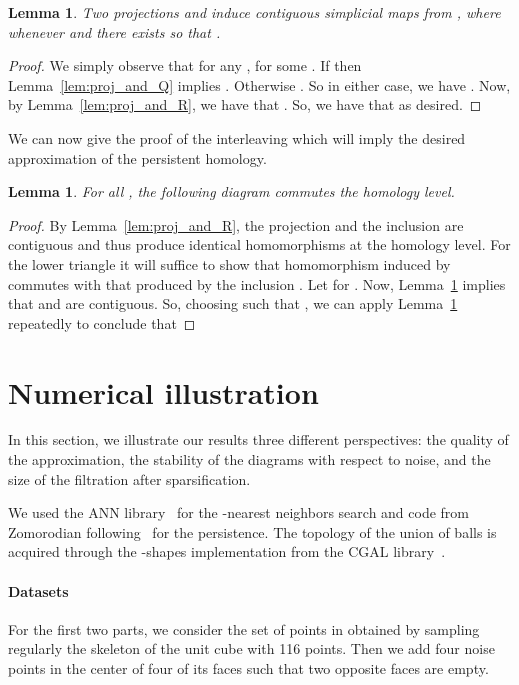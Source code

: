 \documentclass[a4paper]{article}
\newtheorem{lemma}[theorem]{Lemma}
\begin{document}
  \begin{lemma}\label{lem:proj_and_T}
    Two projections  and  induce contiguous simplicial maps from , where  whenever  and there exists  so that .
  \end{lemma}
  \begin{proof}
    We simply observe that for any ,  for some .
    If  then Lemma~\ref{lem:proj_and_Q} implies .
    Otherwise .
    So in either case, we have .
    Now, by Lemma~\ref{lem:proj_and_R}, we have that .
    So, we have that  as desired.
  \end{proof}

  We can now give the proof of the interleaving which will imply the desired approximation of the persistent homology.

  \begin{lemma}\label{lem:interleaving}
    For all , the following diagram commutes the homology level.
    
  \end{lemma}
  \begin{proof}
    By Lemma~\ref{lem:proj_and_R}, the projection  and the inclusion  are contiguous and thus produce identical homomorphisms at the homology level.
    For the lower triangle it will suffice to show that homomorphism induced by  commutes with that produced by the inclusion .
    Let  for .
    Now, Lemma~\ref{lem:proj_and_T} implies that  and  are contiguous.
    So, choosing  such that , we can apply Lemma~\ref{lem:proj_and_T} repeatedly to conclude that
    
  \end{proof}

%
 

\section{Numerical illustration} \label{sNumeric}


In this section, we illustrate our results three different perspectives:
the quality of the approximation,
the stability of the diagrams with respect to noise, and
the size of the filtration after sparsification.

We used the ANN library~\cite{annMS} for the -nearest neighbors search and code from Zomorodian following~\cite{cphCZ} for the persistence.
The topology of the union of balls is acquired through the -shapes implementation from the CGAL library~\cite{cgalAlphaShapes3D}.

\paragraph{Datasets\\}
For the first two parts, we consider the set of points in  obtained by sampling regularly the skeleton of the unit cube with 116 points.
Then we add four noise points in the center of four of its faces such that two opposite faces are empty.
\end{document}
